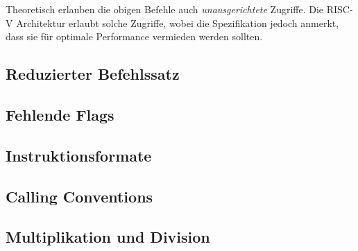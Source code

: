 Theoretisch erlauben die obigen Befehle auch \emph{unausgerichtete}
Zugriffe. Die RISC-V Architektur erlaubt solche Zugriffe, wobei die
Spezifikation jedoch anmerkt, dass sie für optimale Performance vermieden werden
sollten.

\subsection{Reduzierter Befehlssatz}



\subsection{Fehlende Flags}

\subsection{Instruktionsformate}

\subsection{Calling Conventions}

\subsection{Multiplikation und Division}
